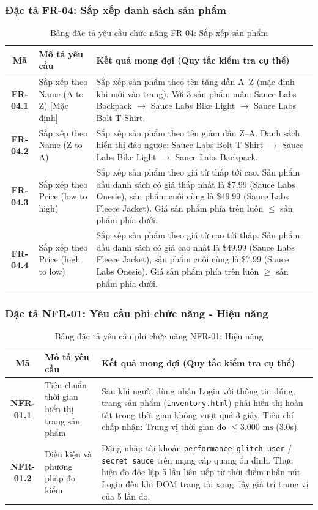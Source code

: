 \documentclass[a4paper]{article}
\begin{document}
\subsubsection{Đặc tả FR-04: Sắp xếp danh sách sản phẩm}
\begin{table}[H]
\centering
\small
\begin{tabularx}{\textwidth}{|c|p{4.5cm}|X|}
\hline
\textbf{Mã} & \textbf{Mô tả yêu cầu} & \textbf{Kết quả mong đợi (Quy tắc kiểm tra cụ thể)} \\ \hline
\textbf{FR-04.1} & Sắp xếp theo Name (A to Z) [Mặc định] & Sắp xếp sản phẩm theo tên tăng dần A--Z (mặc định khi mới vào trang). Với 3 sản phẩm mẫu: Sauce Labs Backpack $\rightarrow$ Sauce Labs Bike Light $\rightarrow$ Sauce Labs Bolt T-Shirt. \\ \hline
\textbf{FR-04.2} & Sắp xếp theo Name (Z to A) & Sắp xếp sản phẩm theo tên giảm dần Z--A. Danh sách hiển thị đảo ngược: Sauce Labs Bolt T-Shirt $\rightarrow$ Sauce Labs Bike Light $\rightarrow$ Sauce Labs Backpack. \\ \hline
\textbf{FR-04.3} & Sắp xếp theo Price (low to high) & Sắp xếp sản phẩm theo giá từ thấp tới cao. Sản phẩm đầu danh sách có giá thấp nhất là \$7.99 (Sauce Labs Onesie), sản phẩm cuối cùng là \$49.99 (Sauce Labs Fleece Jacket). Giá sản phẩm phía trên luôn $\le$ sản phẩm phía dưới. \\ \hline
\textbf{FR-04.4} & Sắp xếp theo Price (high to low) & Sắp xếp sản phẩm theo giá từ cao tới thấp. Sản phẩm đầu danh sách có giá cao nhất là \$49.99 (Sauce Labs Fleece Jacket), sản phẩm cuối cùng là \$7.99 (Sauce Labs Onesie). Giá sản phẩm phía trên luôn $\ge$ sản phẩm phía dưới. \\ \hline
\end{tabularx}
\caption{Bảng đặc tả yêu cầu chức năng FR-04: Sắp xếp sản phẩm}
\end{table}

\subsubsection{Đặc tả NFR-01: Yêu cầu phi chức năng - Hiệu năng}
\begin{table}[H]
\centering
\small
\begin{tabularx}{\textwidth}{|c|p{4.5cm}|X|}
\hline
\textbf{Mã} & \textbf{Mô tả yêu cầu} & \textbf{Kết quả mong đợi (Quy tắc kiểm tra cụ thể)} \\ \hline
\textbf{NFR-01.1} & Tiêu chuẩn thời gian hiển thị trang sản phẩm & Sau khi người dùng nhấn Login với thông tin đúng, trang sản phẩm (\texttt{inventory.html}) phải hiển thị hoàn tất trong thời gian không vượt quá 3 giây. Tiêu chí chấp nhận: Trung vị thời gian đo $\le 3.000\text{ ms}$ (3.0s). \\ \hline
\textbf{NFR-01.2} & Điều kiện và phương pháp đo kiểm & Đăng nhập tài khoản \texttt{performance\_glitch\_user} / \texttt{secret\_sauce} trên mạng cáp quang ổn định. Thực hiện đo độc lập 5 lần liên tiếp từ thời điểm nhấn nút Login đến khi DOM trang tải xong, lấy giá trị trung vị của 5 lần đo. \\ \hline
\end{tabularx}
\caption{Bảng đặc tả yêu cầu phi chức năng NFR-01: Hiệu năng}
\end{table}
\end{document}
